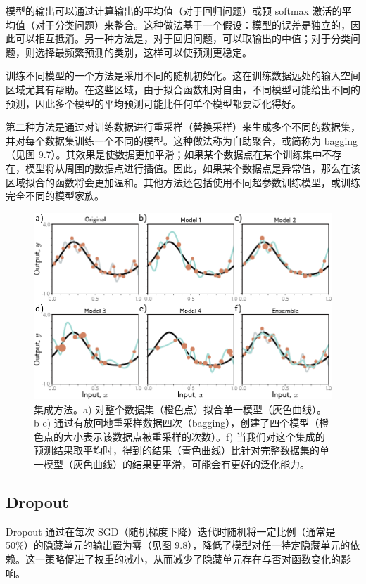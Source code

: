 \documentclass[lang=cn,newtx,10pt,scheme=chinese]{elegantbook}
\begin{document}
模型的输出可以通过计算输出的平均值（对于回归问题）或预 softmax 激活的平均值（对于分类问题）来整合。这种做法基于一个假设：模型的误差是独立的，因此可以相互抵消。另一种方法是，对于回归问题，可以取输出的中值；对于分类问题，则选择最频繁预测的类别，这样可以使预测更稳定。

训练不同模型的一个方法是采用不同的随机初始化。这在训练数据远处的输入空间区域尤其有帮助。在这些区域，由于拟合函数相对自由，不同模型可能给出不同的预测，因此多个模型的平均预测可能比任何单个模型都要泛化得好。

第二种方法是通过对训练数据进行重采样（替换采样）来生成多个不同的数据集，并对每个数据集训练一个不同的模型。这种做法称为自助聚合，或简称为 bagging（见图 9.7）。其效果是使数据更加平滑；如果某个数据点在某个训练集中不存在，模型将从周围的数据点进行插值。因此，如果某个数据点是异常值，那么在该区域拟合的函数将会更加温和。其他方法还包括使用不同超参数训练模型，或训练完全不同的模型家族。

\begin{figure}[ht!]
	\centering
	\includegraphics[width=0.7\linewidth]{PDFFigures/UDLChap9PDF/RegEnsemble.pdf}
	\caption{集成方法。a) 对整个数据集（橙色点）拟合单一模型（灰色曲线）。b-e) 通过有放回地重采样数据四次（bagging），创建了四个模型（橙色点的大小表示该数据点被重采样的次数）。f) 当我们对这个集成的预测结果取平均时，得到的结果（青色曲线）比针对完整数据集的单一模型（灰色曲线）的结果更平滑，可能会有更好的泛化能力。}
\end{figure}

\subsection{Dropout}
Dropout 通过在每次 SGD（随机梯度下降）迭代时随机将一定比例（通常是 50\%）的隐藏单元的输出置为零（见图 9.8），降低了模型对任一特定隐藏单元的依赖。这一策略促进了权重的减小，从而减少了隐藏单元存在与否对函数变化的影响。
\end{document}
